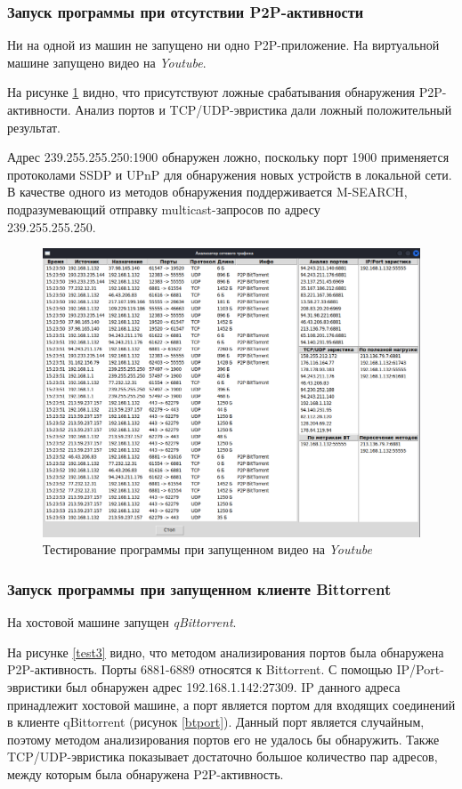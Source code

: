 \documentclass[bachelor, och, coursework]{SCWorks}
\begin{document}
\subsubsection{Запуск программы при отсутствии P2P-активности}
Ни на одной из машин не запущено ни одно P2P-приложение. На виртуальной машине запущено видео на \textit{Youtube}.

На рисунке \ref{test2} видно, что присутствуют ложные срабатывания обнаружения P2P-активности. Анализ портов и TCP/UDP-эвристика дали ложный положительный результат.

Адрес 239.255.255.250:1900 обнаружен ложно, поскольку порт 1900 применяется протоколами SSDP и UPnP для обнаружения новых устройств в локальной сети. В качестве одного из методов обнаружения поддерживается M-SEARCH, подразумевающий отправку multicast-запросов по адресу \\ 239.255.255.250. \cite{IANA}

\begin{figure}[H]
    \centering
    \includegraphics[width=0.999\textwidth]{test2.png}
    \caption{Тестирование программы при запущенном видео на \textit{Youtube}}
    \label{test2}
\end{figure}

\subsubsection{Запуск программы при запущенном клиенте Bittorrent}
На хостовой машине запущен \textit{qBittorrent}. 

На рисунке \ref{test3} видно, что методом анализирования портов была обнаружена P2P-активность. Порты 6881-6889 относятся к Bittorrent. С помощью IP/Port-эвристики был обнаружен адрес 192.168.1.142:27309. IP данного адреса принадлежит хостовой машине, а порт является портом для входящих соединений в клиенте qBittorrent (рисунок \ref{btport}). Данный порт является случайным, поэтому методом анализирования портов его не удалось бы обнаружить. Также TCP/UDP-эвристика показывает достаточно большое количество пар адресов, между которым была обнаружена P2P-активность.
\end{document}
